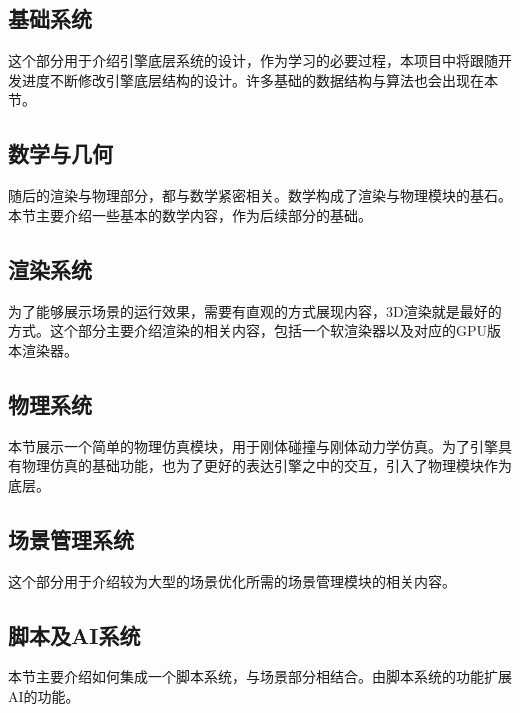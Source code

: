 \maketitle
\subsection{基础系统}

这个部分用于介绍引擎底层系统的设计，作为学习的必要过程，本项目中将跟随开发进度不断修改引擎底层结构的设计。许多基础的数据结构与算法也会出现在本节。

\maketitle
\subsection{数学与几何}

随后的渲染与物理部分，都与数学紧密相关。数学构成了渲染与物理模块的基石。本节主要介绍一些基本的数学内容，作为后续部分的基础。

\maketitle
\subsection{渲染系统}

为了能够展示场景的运行效果，需要有直观的方式展现内容，3D渲染就是最好的方式。这个部分主要介绍渲染的相关内容，包括一个软渲染器以及对应的GPU版本渲染器。

\maketitle
\subsection{物理系统}

本节展示一个简单的物理仿真模块，用于刚体碰撞与刚体动力学仿真。为了引擎具有物理仿真的基础功能，也为了更好的表达引擎之中的交互，引入了物理模块作为底层。

\maketitle
\subsection{场景管理系统}

这个部分用于介绍较为大型的场景优化所需的场景管理模块的相关内容。

\maketitle
\subsection{脚本及AI系统}

本节主要介绍如何集成一个脚本系统，与场景部分相结合。由脚本系统的功能扩展AI的功能。
